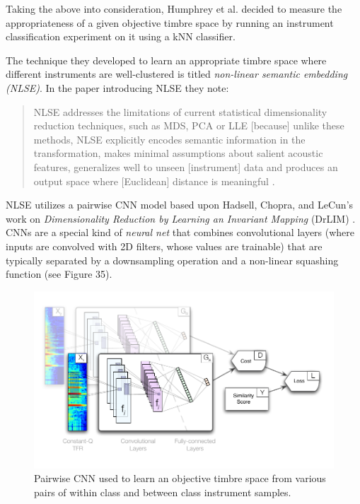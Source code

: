 \documentclass[12pt]{report} 	%
\numberwithin{figure}{chapter}
\numberwithin{table}{chapter}
\numberwithin{equation}{chapter}
\begin{document}
\begin{flushleft}
Taking the above into consideration, Humphrey et al. decided to measure the appropriateness of a given objective timbre space by running an instrument classification experiment on it using a kNN classifier.

The technique they developed to learn an appropriate timbre space where different instruments are well-clustered is titled \textit{non-linear semantic embedding (NLSE)}. In the paper introducing NLSE they note:
\begin{singlespace}
\begin{quote}
NLSE addresses the limitations of current statistical dimensionality reduction techniques, such as MDS, PCA or LLE [because] unlike these methods, NLSE explicitly encodes semantic information in the transformation, makes minimal assumptions about salient acoustic features, generalizes well to unseen [instrument] data and produces an output space where [Euclidean] distance is meaningful \cite[p. 1]{Humphrey:2000th}.
\end{quote}
\end{singlespace}
NLSE utilizes a pairwise CNN model based upon Hadsell, Chopra, and LeCun's work on \textit{Dimensionality Reduction by Learning an Invariant Mapping} (DrLIM) \cite{hadsell2006dimensionality}. CNNs are a special kind of \textit{neural net} that combines convolutional layers (where inputs are convolved with 2D filters, whose values are trainable) that are typically separated by a downsampling operation and a non-linear squashing function (see Figure 35). 
\begin{figure}[h!]
\begin{center}
\includegraphics[scale=0.95]{PairwiseCNN}
\caption[Pairwise CNN architecture]{Pairwise CNN used to learn an objective timbre space from various pairs of within class and between class instrument samples.}

\end{center}
\end{figure}
\end{flushleft}
\end{document}
